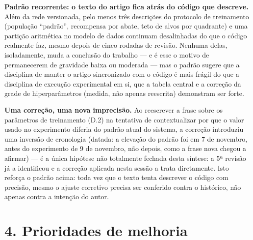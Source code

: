 \documentclass[11pt,a4paper]{article}
\begin{document}
\textbf{Padrão recorrente: o texto do artigo fica atrás do código que descreve.} Além da rede
versionada, pelo menos três descrições do protocolo de treinamento (população ``padrão'', recompensa
por abate, teto de alvos por quadrante) e uma partição aritmética no modelo de dados continuam
desalinhadas do que o código realmente faz, mesmo depois de cinco rodadas de revisão. Nenhuma delas,
isoladamente, muda a conclusão do trabalho --- e é esse o motivo de permanecerem de gravidade baixa
ou moderada --- mas o padrão sugere que a disciplina de manter o artigo sincronizado com o código é
mais frágil do que a disciplina de execução experimental em si, que a tabela central e a correção da
grade de hiperparâmetros (medida, não apenas reescrita) demonstram ser forte.

\textbf{Uma correção, uma nova imprecisão.} Ao reescrever a frase sobre os parâmetros de
treinamento (D.2) na tentativa de contextualizar por que o valor usado no experimento diferia do
padrão atual do sistema, a correção introduziu uma inversão de cronologia (datada: a elevação do
padrão foi em 7 de novembro, antes do experimento de 9 de novembro, não depois, como a frase nova
chegou a afirmar) --- é a única hipótese não totalmente fechada desta síntese: a 5ª revisão já a
identificou e a correção aplicada nesta sessão a trata diretamente. Isto reforça o padrão acima: toda
vez que o texto tenta descrever o código com precisão, mesmo o ajuste corretivo precisa ser
conferido contra o histórico, não apenas contra a intenção do autor.

\section*{4. Prioridades de melhoria}
\end{document}
